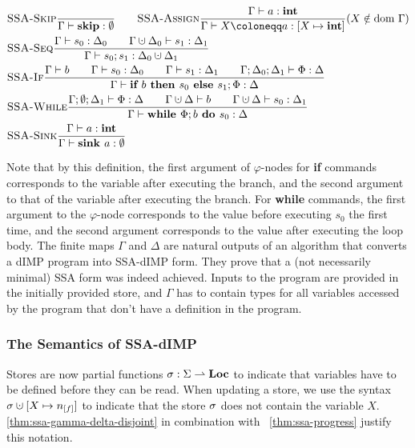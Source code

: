 \begin{align*}
    &\trule{SSA-Skip}{}{\typestep{\Gamma}{\skipcmd}{\emptyset}}\qquad
    \trule{SSA-Assign}{\typestep{\Gamma}{a}{\tint}}{\typestep{\Gamma}{\defaultstore}{[X \mapsto \tint]}} \text{($X \notin \dom\Gamma$)}\\
    &\trule{SSA-Seq}{\typestep{\Gamma}{s_0}{\Delta_0}\qquad
    \typestep{\Gamma \dunion \Delta_0}{s_1}{\Delta_1}}{\typestep{\Gamma}{\defaultssaseq}{\Delta_0 \dunion \Delta_1}}\\
    &\trule{SSA-If}{\typestmt{\Gamma}{b}\qquad\typestep{\Gamma}{s_0}{\Delta_0}\qquad \typestep{\Gamma}{s_1}{\Delta_1}\qquad
    \typestep{\Gamma;\Delta_0;\Delta_1}{\philist}{\Delta}}
    {\typestep{\Gamma}{\defaultssaif}{\Delta}}\\
    &\trule{SSA-While}{\typestep{\Gamma;\emptyset;\Delta_1}{\philist}{\Delta}\qquad
    \typestmt{\Gamma \dunion \Delta}{b}\qquad\typestep{\Gamma \dunion \Delta}{s_0}{\Delta_1}}
    {\typestep{\Gamma}{\defaultssawhile}{\Delta}}\\
    &\trule{SSA-Sink}{\typestep{\Gamma}{a}{\tint}}{\typestep{\Gamma}{\sink{a}}{\emptyset}}\\
\end{align*}

Note that by this definition, the first argument of $\varphi$-nodes for \textbf{if} commands
corresponds to the variable after executing the \btrue{} branch, and the second argument to that
of the variable after executing the \bfalse{} branch.
For \textbf{while} commands, the first argument to the $\varphi$-node corresponds to the value
before executing $s_0$ the first time, and the second argument corresponds to the value 
after executing the loop body.
The finite maps $\Gamma$ and $\Delta$ are natural outputs of an algorithm that converts a 
dIMP program into SSA-dIMP form.
They prove that a (not necessarily minimal) SSA form was indeed achieved.
Inputs to the program are provided in the initially provided store, and $\Gamma$
has to contain types for all variables accessed by the program that don't
have a definition in the program.

\subsubsection*{The Semantics of SSA-dIMP}
Stores are now partial functions $\sigma : \Sigma \rightharpoonup \textbf{Loc}$ to indicate that
variables have to be defined before they can be read.
When updating a store, we use the syntax 
$\store \dunion [X \mapsto \flagged{}]$ to indicate that the store $\sigma$ does not
contain the variable $X$.
\autoref{thm:ssa-gamma-delta-disjoint} in combination with ~\autoref{thm:ssa-progress}
justify this notation.

